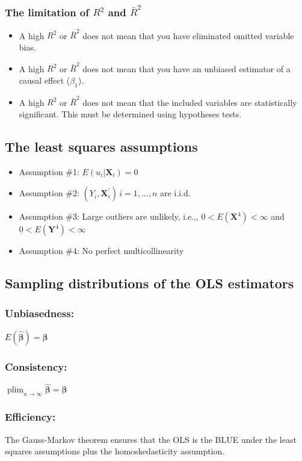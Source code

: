 \documentclass[a4paper,10pt]{article}
\DeclareMathOperator*{\plim}{plim}
\begin{document}
\subsubsection*{The limitation of \(R^2\) and \(\bar{R}^2\)}
\label{sec:org93d3af2}
\begin{itemize}
\item A high \(R^2\) or \(\bar{R}^2\) does not mean that you have eliminated omitted variable bias.
\item A high \(R^2\) or \(\bar{R}^2\) does not mean that you have an unbiased estimator of a causal effect (\(\beta_1\)).
\item A high \(R^2\) or \(\bar{R}^2\) does not mean that the included
variables are statistically significant. This must be determined
using hypotheses tests.
\end{itemize}

\subsection{The least squares assumptions}
\label{sec:org25f7b7c}
\begin{itemize}
\item Assumption \#1: \(E(u_i | \mathbf{X}_i) = 0\)
\item Assumption \#2: \((Y_i, \mathbf{X}_i^{\prime})\, i=1, \ldots, n\) are i.i.d.
\item Assumption \#3: Large outliers are unlikely, i.e.,, \(0 < E(\mathbf{X}^4) < \infty\) and \(0 < E(\mathbf{Y}^4) < \infty\)
\item Assumption \#4: No perfect multicollinearity
\end{itemize}
\subsection{Sampling distributions of the OLS estimators}
\label{sec:org39c1b8b}
\subsubsection*{Unbiasedness:}
\label{sec:orgae23a4a}
\(E(\hat{\boldsymbol{\beta}}) = \boldsymbol{\beta}\)
\subsubsection*{Consistency:}
\label{sec:org8cd12bd}
\(\plim_{n \rightarrow \infty} \hat{\boldsymbol{\beta}} = \boldsymbol{\beta}\)
\subsubsection*{Efficiency:}
\label{sec:org4f2576c}
The Gauss-Markov theorem ensures that the OLS is the BLUE under the least
squares assumptions plus the homoskedasticity assumption. 
\end{document}
